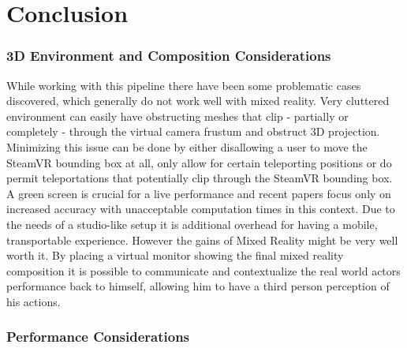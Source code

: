 %
\chapter{Conclusion}


\subsection{3D Environment and Composition Considerations}

While working with this pipeline there have been some problematic cases 
discovered, which generally do not work well with mixed reality. Very cluttered 
environment can easily have obstructing meshes that clip - partially or 
completely - through the virtual camera frustum and obstruct 3D projection. 
Minimizing this issue can be done by either disallowing a user to move the 
SteamVR bounding box at all, only allow for certain teleporting positions or do 
permit teleportations that potentially clip through the SteamVR bounding box.
\newline
A green screen is crucial for a live performance and recent papers focus only 
on increased accuracy with unacceptable computation times in this context. Due 
to the needs of a studio-like setup it is additional overhead for having a 
mobile, transportable experience. However the gains of Mixed Reality might be 
very well worth it. 
\newline
By placing a virtual monitor showing the final mixed reality composition it is 
possible to communicate and contextualize the real world actors performance 
back to himself, allowing him to have a third person perception of his actions.

\subsection{Performance Considerations}

